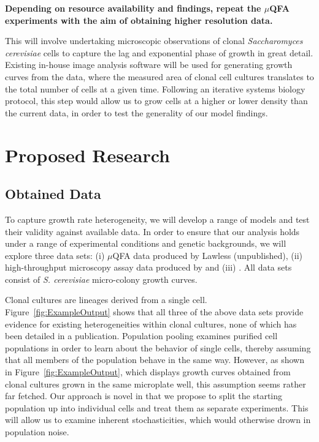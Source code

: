 \documentclass{bioinfo}
\begin{document}
\textbf{Depending on resource availability and findings, repeat the $\mu$QFA experiments with the aim of obtaining higher resolution data.}
\begin{addmargin}[1.5em]{1.5em}
This will involve undertaking microscopic observations of clonal \textit{Saccharomyces cerevisiae} cells to capture the lag and exponential phase of growth in great detail. Existing in-house image analysis software will be used for generating growth curves from the data, where the measured area of clonal cell cultures translates to the total number of cells at a given time. Following an iterative systems biology protocol, this step would allow us to grow cells at a higher or lower density than the current data, in order to test the generality of our model findings. 
\end{addmargin}

\section{Proposed Research}

\subsection{Obtained Data}

To capture growth rate heterogeneity, we will develop a range of models and test their validity against available data. In order to ensure that our analysis holds under a range of experimental conditions and genetic backgrounds, we will explore three data sets: (i) $\mu$QFA data produced by Lawless (unpublished), (ii) high-throughput microscopy assay data produced by \citealp{Levy12} and (iii) \citealp{Ziv13}. All data sets consist of \textit{S. cerevisiae} micro-colony growth curves.

Clonal cultures are lineages derived from a single cell. Figure~\ref{fig:ExampleOutput} shows that all three of the above data sets provide evidence for existing heterogeneities within clonal cultures, none of which has been detailed in a publication. Population pooling examines purified cell populations in order to learn about the behavior of single cells, thereby assuming that all members of the population behave in the same way. However, as shown in Figure~\ref{fig:ExampleOutput}, which displays growth curves obtained from clonal cultures grown in the same microplate well, this assumption seems rather far fetched. Our approach is novel in that we propose to split the starting population up into individual cells and treat them as separate experiments. This will allow us to examine inherent stochasticities, which would otherwise drown in population noise. 
\end{document}
